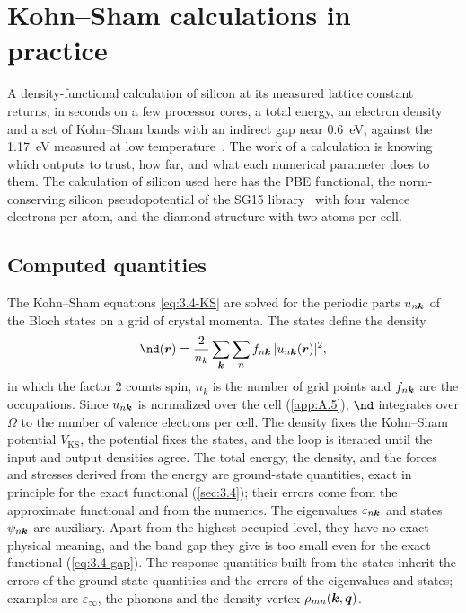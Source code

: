 \section{Kohn--Sham calculations in practice}\label{app:E.1}

A density-functional calculation of silicon at its measured lattice constant returns, in seconds on a few processor cores, a total energy, an electron density and a set of Kohn--Sham bands with an indirect gap near \SI{0.6}{eV}, against the \SI{1.17}{eV} measured at low temperature~\cite[Eq.~(11)]{ramanathan2020ionization}. The work of a calculation is knowing which outputs to trust, how far, and what each numerical parameter does to them. The calculation of silicon used here has the PBE functional, the norm-conserving silicon pseudopotential of the SG15 library~\cite{schlipf2015optimization} with four valence electrons per atom, and the diamond structure with two atoms per cell.

\subsection{Computed quantities}

The Kohn--Sham equations \cref{eq:3.4-KS} are solved for the periodic parts $u_{n\bm{k}}$ of the Bloch states on a grid of crystal momenta. The states define the density
\begin{equation}
  \nd(\vect{r}) = \frac{2}{n_k}\sum_{\vect{k}}\sum_{n}f_{n\vect{k}}\,|u_{n\vect{k}}(\vect{r})|^2 ,
  \label{eq:E.1-density}
\end{equation}
in which the factor 2 counts spin, $n_k$ is the number of grid points and $f_{n\bm{k}}$ are the occupations. Since $u_{n\bm{k}}$ is normalized over the cell (\cref{app:A.5}), $\nd$ integrates over $\Omega$ to the number of valence electrons per cell. The density fixes the Kohn--Sham potential $V_{\mathrm{KS}}$, the potential fixes the states, and the loop is iterated until the input and output densities agree. The total energy, the density, and the forces and stresses derived from the energy are ground-state quantities, exact in principle for the exact functional (\cref{sec:3.4}); their errors come from the approximate functional and from the numerics. The eigenvalues $\varepsilon_{n\bm{k}}$ and states $\psi_{n\bm{k}}$ are auxiliary. Apart from the highest occupied level, they have no exact physical meaning, and the band gap they give is too small even for the exact functional (\cref{eq:3.4-gap}). The response quantities built from the states inherit the errors of the ground-state quantities and the errors of the eigenvalues and states; examples are $\varepsilon_\infty$, the phonons and the density vertex $\rho_{mn}(\bm{k}, \bm{q})$.

